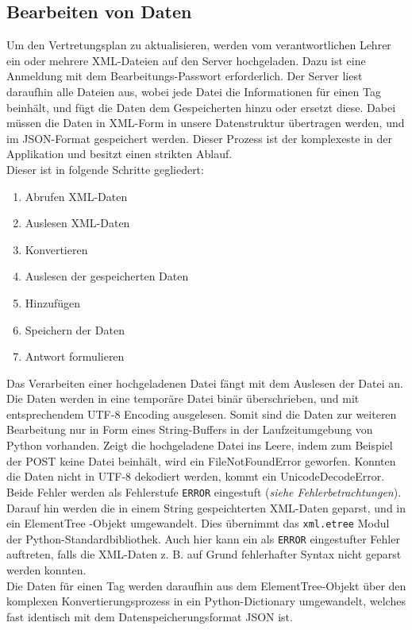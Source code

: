 \subsection{Bearbeiten von Daten}
Um den Vertretungsplan zu aktualisieren, werden vom verantwortlichen Lehrer ein oder mehrere
XML-Dateien auf den Server hochgeladen. Dazu ist eine Anmeldung mit dem Bearbeitungs-Passwort
erforderlich. Der Server liest daraufhin alle Dateien aus, wobei jede Datei die Informationen
für einen Tag beinhält, und fügt die Daten dem Gespeicherten hinzu oder ersetzt diese. Dabei
müssen die Daten in XML-Form in unsere Datenstruktur übertragen werden, und im JSON-Format
gespeichert werden. Dieser Prozess ist der komplexeste in der Applikation und besitzt einen
strikten Ablauf.\\
Dieser ist in folgende Schritte gegliedert:
\begin{enumerate}
	\item Abrufen XML-Daten
	\item Auslesen XML-Daten
	\item Konvertieren
	\item Auslesen der gespeicherten Daten
	\item Hinzufügen
	\item Speichern der Daten
	\item Antwort formulieren
\end{enumerate}
Das Verarbeiten einer hochgeladenen Datei fängt mit dem Auslesen der Datei an. Die Daten werden
in eine temporäre Datei binär überschrieben, und mit entsprechendem UTF-8 Encoding ausgelesen.
Somit sind die Daten zur weiteren Bearbeitung nur in Form eines String-Buffers in der Laufzeitumgebung
von Python vorhanden. Zeigt die hochgeladene Datei ins Leere, indem zum Beispiel der POST keine
Datei beinhält, wird ein FileNotFoundError geworfen. Konnten die Daten nicht in UTF-8
dekodiert werden, kommt ein UnicodeDecodeError. Beide Fehler werden als Fehlerstufe 
\texttt{ERROR} eingestuft (\textit{siehe Fehlerbetrachtungen}).
\\Darauf hin werden die in einem String gespeichterten XML-Daten geparst, und in ein ElementTree
-Objekt umgewandelt. Dies übernimmt das \texttt{xml.etree} Modul der Python-Standardbibliothek.
Auch hier kann ein als \texttt{ERROR} eingestufter Fehler auftreten, falls die XML-Daten z. B. auf
Grund fehlerhafter Syntax nicht geparst werden konnten.\\
Die Daten für einen Tag werden daraufhin aus dem ElementTree-Objekt über den komplexen Konvertierungsprozess
in ein Python-Dictionary umgewandelt, welches fast identisch mit dem Datenspeicherungsformat JSON ist.
